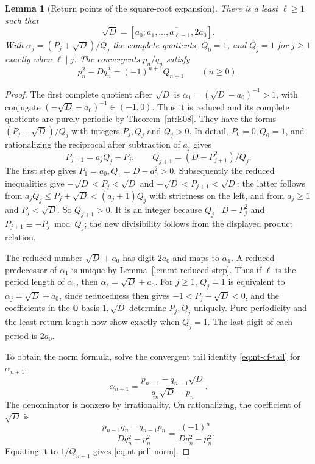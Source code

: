 \documentclass[11pt,oneside,openany]{book}
\theoremstyle{plain}
\newtheorem{lemma}[theorem]{Lemma}
\theoremstyle{definition}
\theoremstyle{remark}
\begin{document}
\begin{lemma}[Return points of the square-root expansion]
\label{lem:nt-pell-return}
There is a least \(\ell\ge1\) such that
\[
 \sqrt D=[a_0;\overline{a_1,\ldots,a_{\ell-1},2a_0}].
\]
With \(\alpha_j=(P_j+\sqrt D)/Q_j\) the complete quotients,
\(Q_0=1\), and \(Q_j=1\) for \(j\ge1\) exactly when \(\ell\mid j\).
The convergents \(p_n/q_n\) satisfy
\begin{equation}\label{eq:nt-pell-norm}
 p_n^2-Dq_n^2=(-1)^{n+1}Q_{n+1}\qquad(n\ge0).
\end{equation}
\end{lemma}
\begin{proof}
The first complete quotient after \(\sqrt D\) is
\(\alpha_1=(\sqrt D-a_0)^{-1}>1\), with conjugate
\((- \sqrt D-a_0)^{-1}\in(-1,0)\). Thus it is reduced and its
complete quotients are purely periodic by Theorem~\ref{nt:E08}.
They have the forms \((P_j+\sqrt D)/Q_j\) with integers \(P_j,Q_j\)
and \(Q_j>0\). In detail, \(P_0=0,Q_0=1\), and rationalizing the
reciprocal after subtraction of \(a_j\) gives
\[
 P_{j+1}=a_j Q_j-P_j,\qquad Q_{j+1}=(D-P_{j+1}^2)/Q_j.
\]
The first step gives \(P_1=a_0,Q_1=D-a_0^2>0\). Subsequently
the reduced inequalities give \(-\sqrt D<P_j<\sqrt D\) and
\(-\sqrt D<P_{j+1}<\sqrt D\): the latter follows from
\(a_jQ_j\le P_j+\sqrt D<(a_j+1)Q_j\) with strictness on the left,
and from \(a_j\ge1\) and \(P_j<\sqrt D\).
So \(Q_{j+1}>0\). It is an integer because \(Q_j\mid D-P_j^2\) and
\(P_{j+1}\equiv-P_j\bmod Q_j\); the new divisibility follows from the
displayed product relation.

The reduced number \(\sqrt D+a_0\) has digit \(2a_0\) and maps
to \(\alpha_1\). A reduced predecessor of \(\alpha_1\) is unique
by Lemma~\ref{lem:nt-reduced-step}. Thus if \(\ell\) is the period
length of \(\alpha_1\), then \(\alpha_\ell=\sqrt D+a_0\).
For \(j\ge1\), \(Q_j=1\) is equivalent to
\(\alpha_j=\sqrt D+a_0\), since reducedness then gives
\(-1<P_j-\sqrt D<0\), and the coefficients in the
\(\mathbb Q\)-basis \(1,\sqrt D\) determine \(P_j,Q_j\) uniquely.
Pure periodicity and the least return length now show exactly
when \(Q_j=1\). The last digit of each period is \(2a_0\).

To obtain the norm formula, solve the convergent tail identity
\eqref{eq:nt-cf-tail} for \(\alpha_{n+1}\):
\[
 \alpha_{n+1}
   =\frac{p_{n-1}-q_{n-1}\sqrt D}{q_n\sqrt D-p_n}.
\]
The denominator is nonzero by irrationality. On rationalizing,
the coefficient of \(\sqrt D\) is
\[
 \frac{p_{n-1}q_n-q_{n-1}p_n}{Dq_n^2-p_n^2}
 =\frac{(-1)^n}{Dq_n^2-p_n^2}.
\]
Equating it to \(1/Q_{n+1}\) gives \eqref{eq:nt-pell-norm}.
\end{proof}
\end{document}
